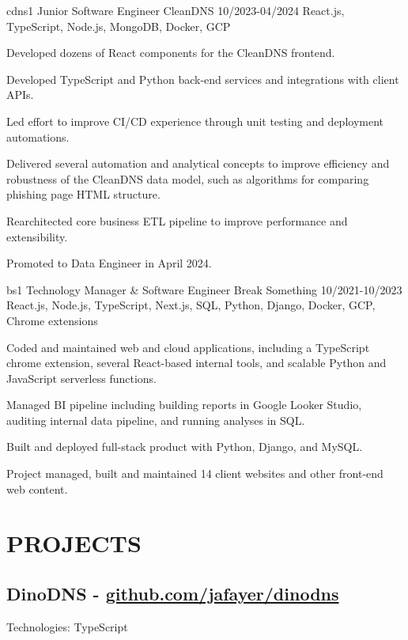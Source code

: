 \documentclass[letterpaper,10pt]{article}
\begin{document}
\jobentry
    {cdns1}
    {Junior Software Engineer}
    {CleanDNS}
    {10/2023-04/2024}
    {React.js, TypeScript, Node.js, MongoDB, Docker, GCP}
    {
        \item Developed dozens of React components for the CleanDNS frontend.
        \item Developed TypeScript and Python back-end services and integrations with client APIs.
        \item Led effort to improve CI/CD experience through unit testing and deployment automations.
        \item Delivered several automation and analytical concepts to improve efficiency and robustness of the CleanDNS data model, such as algorithms for comparing phishing page HTML structure.
        \item Rearchitected core business ETL pipeline to improve performance and extensibility.
        \item Promoted to Data Engineer in April 2024.
    }

\jobentry
    {bs1}
    {Technology Manager \& Software Engineer}
    {Break Something}
    {10/2021-10/2023}
    {React.js, Node.js, TypeScript, Next.js, SQL, Python, Django, Docker, GCP, Chrome extensions}
    {
        \item Coded and maintained web and cloud applications, including a TypeScript chrome extension, several React-based internal tools, and scalable Python and JavaScript serverless functions.
        \item Managed BI pipeline including building reports in Google Looker Studio, auditing internal data pipeline, and running analyses in SQL.
        \item Built and deployed full-stack product with Python, Django, and MySQL.
        \item Project managed, built and maintained 14 client websites and other front-end web content.
    }

\section*{PROJECTS}

\subsection*{DinoDNS - \href{https://github.com/jafayer/dinodns}{\small{github.com/jafayer/dinodns}}}
\noindent Technologies: TypeScript \\
\end{document}
